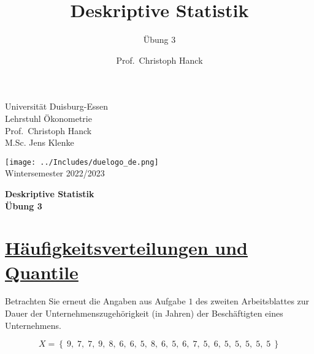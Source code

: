 \documentclass[12pt,a4paper]{article}
\title{Deskriptive Statistik}
\subtitle{Übung 3}
\author{Prof.~Christoph Hanck}
\date{}
\newcommand{\tmpsection}[1]{}
\let\tmpsection=\section
\renewcommand{\section}[1]{\tmpsection{\underline{#1}} }
\begin{document}





\restoregeometry



\begin{minipage}{0.6\textwidth}
Universität Duisburg-Essen\\
Lehrstuhl Ökonometrie\\
Prof.~Christoph Hanck \\
M.Sc. Jens Klenke \\
\end{minipage}

	\begin{flushright}
	\vspace{-3.55cm}
	\texttt{[image: ../Includes/duelogo\_de.png]}\\
	\vspace{.125cm}
	Wintersemester 2022/2023
	\end{flushright}


\begin{center}
	\vspace{.25cm}
	\textbf{\Large{Deskriptive Statistik}}\\
	\vspace{.25cm}
	\textbf{\large{Übung 3}}\\
	\vspace{.125cm}
\end{center}





\hypertarget{huxe4ufigkeitsverteilungen-und-quantile}{%
\section{Häufigkeitsverteilungen und
Quantile}\label{huxe4ufigkeitsverteilungen-und-quantile}}

Betrachten Sie erneut die Angaben aus Aufgabe \(1\) des zweiten
Arbeitsblattes zur Dauer der Unternehmenszugehörigkeit (in Jahren) der
Beschäftigten eines Unternehmens.

\[X = \left\{ \ 9, \; 7, \; 7, \; 9, \; 8, \; 6, \; 6, \; 5, \; 8, \; 6, \; 5, \; 6, \; 7, \; 5 , \; 6, \; 5, \; 5, \; 5, \; 5, \; 5 \ \right\}
\]
\end{document}
